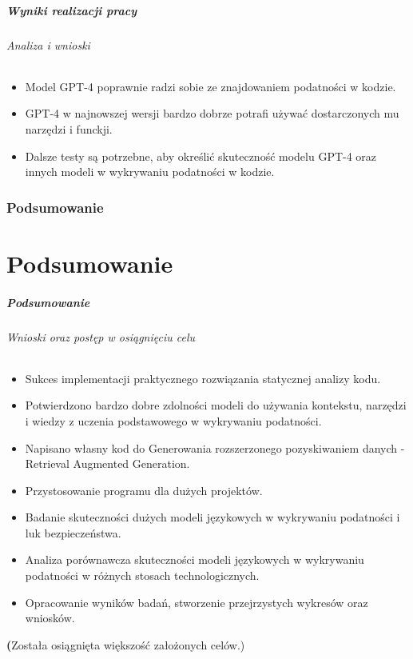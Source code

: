 \documentclass[lualatex,aspectratio=54,12pt,]{beamer}
\begin{document}
    
\begin{frame}
      \frametitle{Wyniki realizacji pracy}
      \framesubtitle{Analiza i wnioski}
      \begin{itemize}
            \item Model GPT-4 poprawnie radzi sobie ze znajdowaniem podatności w kodzie.
            \item GPT-4 w najnowszej wersji bardzo dobrze potrafi używać dostarczonych mu narzędzi i funckji.
            \item Dalsze testy są potrzebne, aby określić skuteczność modelu GPT-4 oraz innych modeli w wykrywaniu podatności w kodzie.
      \end{itemize}

\end{frame}

\section{Podsumowanie}
\part{Podsumowanie}

\begin{frame}
      \partpage
\end{frame}

\begin{frame}
      \frametitle{Podsumowanie}
      \framesubtitle{Wnioski oraz postęp w osiągnięciu celu}
      \begin{itemize}
            \item Sukces implementacji praktycznego rozwiązania statycznej analizy kodu.
            \item Potwierdzono bardzo dobre zdolności modeli do używania kontekstu, narzędzi i wiedzy z uczenia podstawowego w wykrywaniu podatności.
            \item Napisano własny kod do Generowania rozszerzonego pozyskiwaniem danych - Retrieval Augmented Generation.
            \item \alert{Przystosowanie programu dla dużych projektów.}
            \item \alert{Badanie skuteczności dużych modeli językowych w wykrywaniu podatności i luk bezpieczeństwa.}
            \item \alert{Analiza porównawcza skuteczności modeli językowych w wykrywaniu podatności w różnych stosach technologicznych.}
            \item \alert{Opracowanie wyników badań, stworzenie przejrzystych wykresów oraz wniosków.}
      \end{itemize}
      \textbf(Została osiągnięta większość założonych celów.)
\end{frame}
\end{document}
